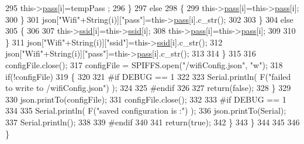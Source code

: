 \begin{DoxyCode}
295                         this->\hyperlink{classCoolWifi_a0c3332a149245aaad060b32593a54c9b}{pass}[i]=tempPass ;                    
296                     \}
297                     \textcolor{keywordflow}{else}
298                     \{
299                         this->\hyperlink{classCoolWifi_a0c3332a149245aaad060b32593a54c9b}{pass}[i]=this->\hyperlink{classCoolWifi_a0c3332a149245aaad060b32593a54c9b}{pass}[i];                    
300                     \}
301                     json[\textcolor{stringliteral}{"Wifi"}+String(i)][\textcolor{stringliteral}{"pass"}]=this->\hyperlink{classCoolWifi_a0c3332a149245aaad060b32593a54c9b}{pass}[i].c\_str();           
302                 
303                 \}
304                 \textcolor{keywordflow}{else}
305                 \{
306                     
307                     this->\hyperlink{classCoolWifi_a893b21d0fed821438733bba2e73fb4c2}{ssid}[i]=this->\hyperlink{classCoolWifi_a893b21d0fed821438733bba2e73fb4c2}{ssid}[i];
308                     this->\hyperlink{classCoolWifi_a0c3332a149245aaad060b32593a54c9b}{pass}[i]=this->\hyperlink{classCoolWifi_a0c3332a149245aaad060b32593a54c9b}{pass}[i];                    
309                     
310                 \}
311                 json[\textcolor{stringliteral}{"Wifi"}+String(i)][\textcolor{stringliteral}{"ssid"}]=this->\hyperlink{classCoolWifi_a893b21d0fed821438733bba2e73fb4c2}{ssid}[i].c\_str();
312                 json[\textcolor{stringliteral}{"Wifi"}+String(i)][\textcolor{stringliteral}{"pass"}]=this->\hyperlink{classCoolWifi_a0c3332a149245aaad060b32593a54c9b}{pass}[i].c\_str();           
313                         
314             \}
315 
316             configFile.close();
317             configFile = SPIFFS.open(\textcolor{stringliteral}{"/wifiConfig.json"}, \textcolor{stringliteral}{"w"});
318             \textcolor{keywordflow}{if}(!configFile)
319             \{
320             
321 \textcolor{preprocessor}{            #if DEBUG == 1 }
322 
323                 Serial.println( F(\textcolor{stringliteral}{"failed to write to /wifiConfig.json"}) );
324             
325 \textcolor{preprocessor}{            #endif}
326 
327                 \textcolor{keywordflow}{return}(\textcolor{keyword}{false});              
328             \}
329             
330             json.printTo(configFile);
331             configFile.close();
332 
333 \textcolor{preprocessor}{        #if DEBUG == 1 }
334 
335             Serial.println( F(\textcolor{stringliteral}{"saved configuration is :"}) );
336             json.printTo(Serial);
337             Serial.println();
338         
339 \textcolor{preprocessor}{        #endif}
340 
341             \textcolor{keywordflow}{return}(\textcolor{keyword}{true}); 
342         \}
343     \}   
344     
345 
346 \}
\end{DoxyCode}
